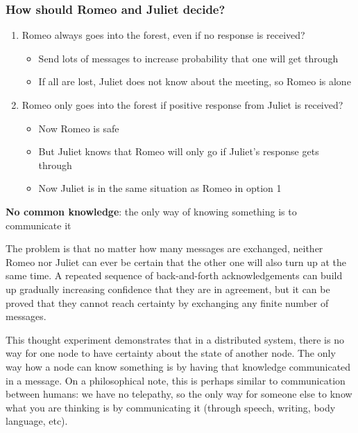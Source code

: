 \begin{frame}
    \label{s:two-generals-proto}
    \frametitle{How should Romeo and Juliet decide?}
    \begin{enumerate}
        \item Romeo always goes into the forest, even if no response is received?
            \begin{itemize}
                \item Send lots of messages to increase probability that one will get through
                \item If all are lost, Juliet does not know about the meeting, so Romeo is alone\\[1em]\pause
            \end{itemize}
        \item Romeo only goes into the forest if positive response from Juliet is received?
            \begin{itemize}
                \item Now Romeo is safe
                \item But Juliet knows that Romeo will only go if Juliet's response gets through
                \item Now Juliet is in the same situation as Romeo in option 1\\[0.5em]\pause
            \end{itemize}
    \end{enumerate}
    \textbf{No common knowledge}: the only way of knowing something is to communicate it
\end{frame}

The problem is that no matter how many messages are exchanged, neither Romeo nor Juliet can ever be certain that the other one will also turn up at the same time.
A repeated sequence of back-and-forth acknowledgements can build up gradually increasing confidence that they are in agreement, but it can be proved that they cannot reach certainty by exchanging any finite number of messages.

This thought experiment demonstrates that in a distributed system, there is no way for one node to have certainty about the state of another node.
The only way how a node can know something is by having that knowledge communicated in a message.
On a philosophical note, this is perhaps similar to communication between humans: we have no telepathy, so the only way for someone else to know what you are thinking is by communicating it (through speech, writing, body language, etc).

